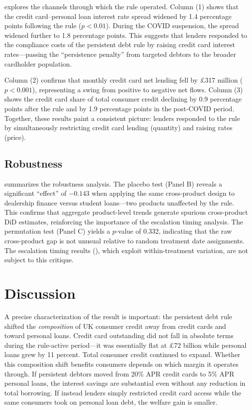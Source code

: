 \documentclass[12pt]{article}
\begin{document}
 explores the channels through which the rule operated. Column (1) shows that the credit card--personal loan interest rate spread widened by 1.4 percentage points following the rule ($p < 0.01$). During the COVID suspension, the spread widened further to 1.8 percentage points. This suggests that lenders responded to the compliance costs of the persistent debt rule by raising credit card interest rates---passing the ``persistence penalty'' from targeted debtors to the broader cardholder population.

Column (2) confirms that monthly credit card net lending fell by \pounds317 million ($p < 0.001$), representing a swing from positive to negative net flows. Column (3) shows the credit card share of total consumer credit declining by 0.9 percentage points after the rule and by 1.9 percentage points in the post-COVID period. Together, these results paint a consistent picture: lenders responded to the rule by simultaneously restricting credit card lending (quantity) and raising rates (price).

\subsection{Robustness}



 summarizes the robustness analysis. The placebo test (Panel B) reveals a significant ``effect'' of $-0.143$ when applying the same cross-product design to dealership finance versus student loans---two products unaffected by the rule. This confirms that aggregate product-level trends generate spurious cross-product DiD estimates, reinforcing the importance of the escalation timing analysis. The permutation test (Panel C) yields a $p$-value of 0.332, indicating that the raw cross-product gap is not unusual relative to random treatment date assignments. The escalation timing results (), which exploit within-treatment variation, are not subject to this critique.

\section{Discussion}

A precise characterization of the result is important: the persistent debt rule shifted the \textit{composition} of UK consumer credit away from credit cards and toward personal loans. Credit card outstanding did not fall in absolute terms during the rule-active period---it was essentially flat at \pounds72 billion while personal loans grew by 11 percent. Total consumer credit continued to expand. Whether this composition shift benefits consumers depends on which margin it operates through. If persistent debtors moved from 20\% APR credit cards to 5\% APR personal loans, the interest savings are substantial even without any reduction in total borrowing. If instead lenders simply restricted credit card access while the same consumers took on personal loan debt, the welfare gain is smaller.
\end{document}
